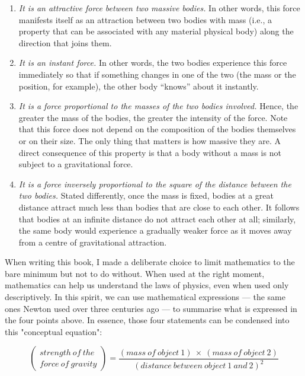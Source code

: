 \begin{enumerate}
\def\labelenumi{\arabic{enumi}.}
\item

  \emph{It is an attractive force between two massive bodies.} In other words, this
  force manifests itself as an attraction between two bodies with mass (i.e., a property
  that can be associated with any material physical body) along the direction that joins
  them.
\item

  \emph{It is an instant force.} In other words, the two bodies experience this force
  immediately so that if something changes in one of the two (the mass or the position,
  for example), the other body ``knows'' about it instantly.
\item

  \emph{It is a force proportional to the masses of the two bodies involved.} Hence, the
  greater the mass of the bodies, the greater the intensity of the force. Note that this
  force does not depend on the composition of the bodies themselves or on their size.
  The only thing that matters is how massive they are. A direct consequence of this
  property is that a body without a mass is not subject to a gravitational force.
\item

  \emph{It is a force inversely proportional to the square of the distance between the
  two bodies.} Stated differently, once the mass is fixed, bodies at a great distance
  attract much less than bodies that are close to each other. It follows that bodies at
  an infinite distance do not attract each other at all; similarly, the same body would
  experience a gradually weaker force as it moves away from a centre of gravitational
  attraction.
\end{enumerate}

When writing this book, I made a deliberate choice to limit mathematics to the bare
minimum but not to do without. When used at the right moment, mathematics can help us
understand the laws of physics, even when used only descriptively. In this spirit, we
can use mathematical expressions --- the same ones Newton used over three centuries ago
--- to summarise what is expressed in the four points above. In essence, those four
statements can be condensed into this "conceptual equation":

\[\begin{pmatrix}
strength\ of\ the \\
force\ of\ gravity
\end{pmatrix} = \frac{(mass\ of\ object\ 1)\  \times \ (mass\ of\ object\ 2)}{(distance\ between\ object\ 1\ and\ 2)^{2}}\]


